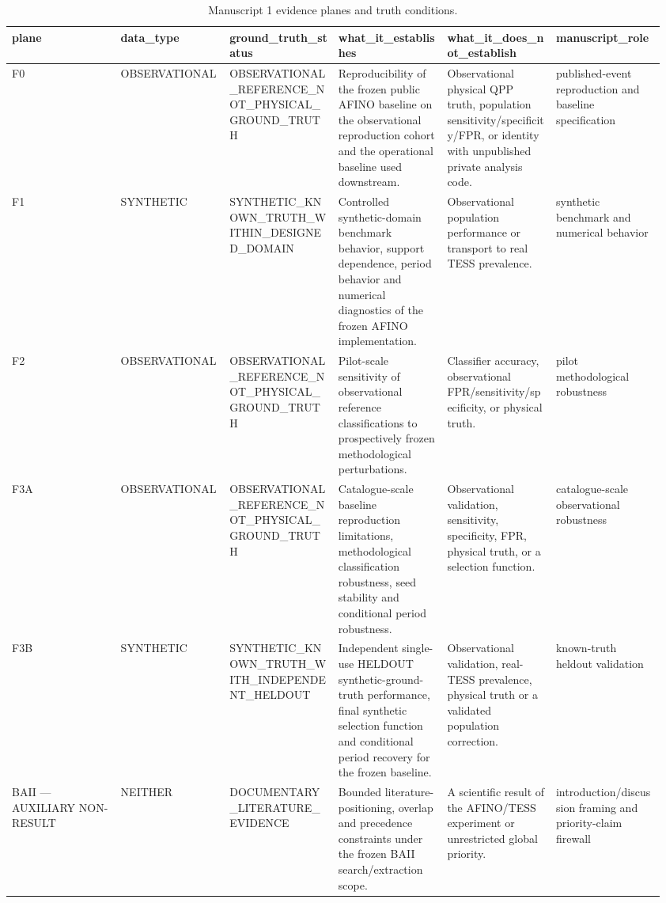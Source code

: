 \begin{table}[t]
\centering
\small
\caption{Manuscript 1 evidence planes and truth conditions.}
\label{tab:m1\_evidence\_planes}
\begin{tabular}{p{0.16\linewidth}p{0.16\linewidth}p{0.16\linewidth}p{0.16\linewidth}p{0.16\linewidth}p{0.16\linewidth}}
\hline
\textbf{plane} & \textbf{data\_type} & \textbf{ground\_truth\_status} & \textbf{what\_it\_establishes} & \textbf{what\_it\_does\_not\_establish} & \textbf{manuscript\_role} \\
\hline
F0 & OBSERVATIONAL & OBSERVATIONAL\_REFERENCE\_NOT\_PHYSICAL\_GROUND\_TRUTH & Reproducibility of the frozen public AFINO baseline on the observational reproduction cohort and the operational baseline used downstream. & Observational physical QPP truth, population sensitivity/specificity/FPR, or identity with unpublished private analysis code. & published-event reproduction and baseline specification \\
F1 & SYNTHETIC & SYNTHETIC\_KNOWN\_TRUTH\_WITHIN\_DESIGNED\_DOMAIN & Controlled synthetic-domain benchmark behavior, support dependence, period behavior and numerical diagnostics of the frozen AFINO implementation. & Observational population performance or transport to real TESS prevalence. & synthetic benchmark and numerical behavior \\
F2 & OBSERVATIONAL & OBSERVATIONAL\_REFERENCE\_NOT\_PHYSICAL\_GROUND\_TRUTH & Pilot-scale sensitivity of observational reference classifications to prospectively frozen methodological perturbations. & Classifier accuracy, observational FPR/sensitivity/specificity, or physical truth. & pilot methodological robustness \\
F3A & OBSERVATIONAL & OBSERVATIONAL\_REFERENCE\_NOT\_PHYSICAL\_GROUND\_TRUTH & Catalogue-scale baseline reproduction limitations, methodological classification robustness, seed stability and conditional period robustness. & Observational validation, sensitivity, specificity, FPR, physical truth, or a selection function. & catalogue-scale observational robustness \\
F3B & SYNTHETIC & SYNTHETIC\_KNOWN\_TRUTH\_WITH\_INDEPENDENT\_HELDOUT & Independent single-use HELDOUT synthetic-ground-truth performance, final synthetic selection function and conditional period recovery for the frozen baseline. & Observational validation, real-TESS prevalence, physical truth or a validated population correction. & known-truth heldout validation \\
BAII — AUXILIARY NON-RESULT & NEITHER & DOCUMENTARY\_LITERATURE\_EVIDENCE & Bounded literature-positioning, overlap and precedence constraints under the frozen BAII search/extraction scope. & A scientific result of the AFINO/TESS experiment or unrestricted global priority. & introduction/discussion framing and priority-claim firewall \\
\hline
\end{tabular}
\end{table}
